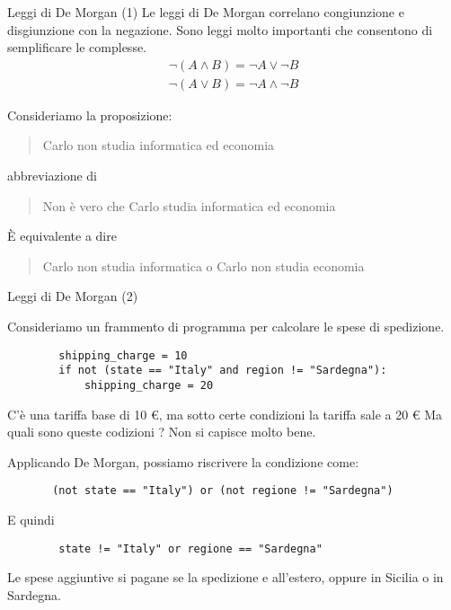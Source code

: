 \documentclass[aspectratio=169,10pt,dvipsnames,handout]{beamer}
\begin{document}
\begin{frame}{Leggi di De Morgan (1)}
    Le leggi di De Morgan correlano congiunzione e disgiunzione con la negazione. Sono leggi molto importanti che consentono di semplificare le \fp complesse.
    \begin{gather*}
        \neg (A \wedge B) = \neg A \vee \neg B\\
        \neg (A \vee B) = \neg A \wedge \neg B
    \end{gather*}

    \begin{example}
        Consideriamo la proposizione:
        \begin{quote}
            Carlo non studia informatica ed economia
        \end{quote}
        abbreviazione di
        \begin{quote}
            Non è vero che Carlo studia informatica ed economia
        \end{quote}
        È equivalente a dire
        \begin{quote}
            Carlo non studia informatica o Carlo non studia economia
        \end{quote}
    \end{example}
\end{frame}

\begin{frame}[fragile]{Leggi di De Morgan (2)}
    \begin{example}
        Consideriamo un frammento di  programma per calcolare le spese di spedizione.

        \begin{verbatim}
        shipping_charge = 10
        if not (state == "Italy" and region != "Sardegna"):
            shipping_charge = 20
    \end{verbatim}

        C'è una tariffa base di 10 €, ma sotto certe condizioni la tariffa sale a 20 € Ma quali sono queste codizioni ? Non si capisce molto bene.

        \pause \medskip
        Applicando De Morgan, possiamo riscrivere la condizione come:
        \begin{verbatim}
       (not state == "Italy") or (not regione != "Sardegna")
    \end{verbatim}

        \pause \medskip
        E quindi
        \begin{verbatim}
        state != "Italy" or regione == "Sardegna"
    \end{verbatim}
        Le spese aggiuntive si pagane se la spedizione e all'estero, oppure in Sicilia o in Sardegna.
    \end{example}
\end{frame}
\end{document}
